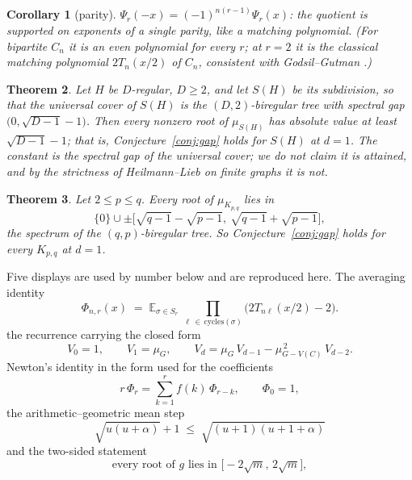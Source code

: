 \documentclass[11pt]{article}
\newtheorem{theorem}{Theorem}
\newtheorem{corollary}[theorem]{Corollary}
\theoremstyle{remark}
\newcommand{\E}{\mathbb{E}}
\begin{document}
\begin{corollary}[parity]\label{cor:parity}
$\Psi_r(-x)=(-1)^{n(r-1)}\Psi_r(x)$: the quotient is supported on exponents
of a single parity, like a matching polynomial. (For bipartite $C_n$ it is an
even polynomial for every $r$; at $r=2$ it is the classical matching
polynomial $2T_n(x/2)$ of $C_n$, consistent with Godsil--Gutman
\cite{GG}.)
\end{corollary}

\begin{theorem}\label{thm:subdiv}
Let $H$ be $D$-regular, $D\ge2$, and let $S(H)$ be its subdivision, so that the
universal cover of $S(H)$ is the $(D,2)$-biregular tree with spectral gap
$\bigl(0,\sqrt{D-1}-1\bigr)$. Then every nonzero root of $\mu_{S(H)}$ has
absolute value at least $\sqrt{D-1}-1$; that is,
Conjecture~\ref{conj:gap} holds for $S(H)$ at $d=1$. The constant is the spectral
gap of the universal cover; we do not claim it is attained, and by the strictness
of Heilmann--Lieb on finite graphs it is not.
\end{theorem}

\begin{theorem}\label{thm:kpq}
Let $2\le p\le q$. Every root of $\mu_{K_{p,q}}$ lies in
\[
\{0\}\cup\pm\bigl[\sqrt{q-1}-\sqrt{p-1},\ \sqrt{q-1}+\sqrt{p-1}\bigr],
\]
the spectrum of the $(q,p)$-biregular tree. So Conjecture~\ref{conj:gap} holds for
every $K_{p,q}$ at $d=1$.
\end{theorem}

Five displays are used by number below and are reproduced here. The averaging identity
\begin{equation}\label{eq:avg}
\Phi_{n,r}(x)\;=\;\E_{\sigma\in S_r}\;
\prod_{\ell\,\in\,\mathrm{cycles}(\sigma)}\bigl(2T_{n\ell}(x/2)-2\bigr).
\end{equation}
the recurrence carrying the closed form
\begin{equation}\label{eq:V}
V_0=1,\qquad V_1=\mu_G,\qquad
V_d=\mu_G\,V_{d-1}-\mu_{G-V(C)}^{\,2}\,V_{d-2}.
\end{equation}
Newton's identity in the form used for the coefficients
\begin{equation}\label{eq:newton}
r\,\Phi_r=\sum_{k=1}^{r}f(k)\,\Phi_{r-k},\qquad\Phi_0=1 ,
\end{equation}
the arithmetic--geometric mean step
\begin{equation}\label{eq:amgm}
\sqrt{u(u+\alpha)}+1\;\le\;\sqrt{(u+1)(u+1+\alpha)}
\end{equation}
and the two-sided statement
\begin{equation}\label{eq:twosided}
\text{every root of }g\text{ lies in }\bigl[-2\sqrt m,\,2\sqrt m\bigr],
\end{equation}
\end{document}
